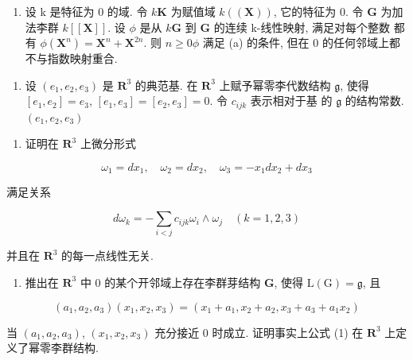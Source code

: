 \begin{enumerate}
\def\labelenumi{(\alph{enumi})}
\setcounter{enumi}{1}
\tightlist
\item
  设 k 是特征为 0 的域. 令 \(k\)\(\mathbf{K}\) 为赋值域 \(k((\mathbf{X}))\), 它的特征为 0. 令 \(\mathbf{G}\) 为加法李群 \(k[[\mathbf{X}]]\). 设 \(\phi\) 是从 \(k\)\(\mathbf{G}\) 到 \(\mathbf{G}\) 的连续 k-线性映射, 满足对每个整数  都有 \(\phi(\mathbf{X}^n) = \mathbf{X}^n + \mathbf{X}^{2n}\). 则 \(n \geqslant 0\)\(\phi\) 满足 (a) 的条件, 但在 0 的任何邻域上都不与指数映射重合.
\end{enumerate}

\begin{enumerate}
\def\labelenumi{\arabic{enumi}.}
\setcounter{enumi}{4}
\tightlist
\item
  设 \((e_1, e_2, e_3)\) 是 \(\mathbf{R}^3\) 的典范基. 在 \(\mathbf{R}^3\) 上赋予幂零李代数结构 \(\mathfrak{g}\), 使得 \([e_1, e_2] = e_3\), \([e_1, e_3] = [e_2, e_3] = 0\). 令 \(c_{ijk}\) 表示相对于基  的 \(\mathfrak{g}\) 的结构常数.\((e_1, e_2, e_3)\)
\end{enumerate}

\begin{enumerate}
\def\labelenumi{(\alph{enumi})}
\tightlist
\item
  证明在 \(\mathbf{R}^3\) 上微分形式
\end{enumerate}

\[
\omega_ {1} = d x _ {1}, \quad \omega_ {2} = d x _ {2}, \quad \omega_ {3} = - x _ {1} d x _ {2} + d x _ {3}
\]

满足关系

\[
d \omega_ {k} = - \sum_ {i <   j} c _ {i j k} \omega_ {i} \wedge \omega_ {j} \quad (k = 1, 2, 3)
\]

并且在 \(\mathbf{R}^3\) 的每一点线性无关.

\begin{enumerate}
\def\labelenumi{(\alph{enumi})}
\setcounter{enumi}{1}
\tightlist
\item
  推出在 \(\mathbf{R}^3\) 中 0 的某个开邻域上存在李群芽结构 \(\mathbf{G}\), 使得 \(\mathrm{L}(\mathrm{G}) = \mathfrak{g}\), 且
\end{enumerate}

\[
(a _ {1}, a _ {2}, a _ {3}) (x _ {1}, x _ {2}, x _ {3}) = (x _ {1} + a _ {1}, x _ {2} + a _ {2}, x _ {3} + a _ {3} + a _ {1} x _ {2})\tag{1}
\]

当 \((a_{1}, a_{2}, a_{3})\), \((x_{1}, x_{2}, x_{3})\) 充分接近 0 时成立. 证明事实上公式 (1) 在 \(\mathbf{R}^{3}\) 上定义了幂零李群结构.

